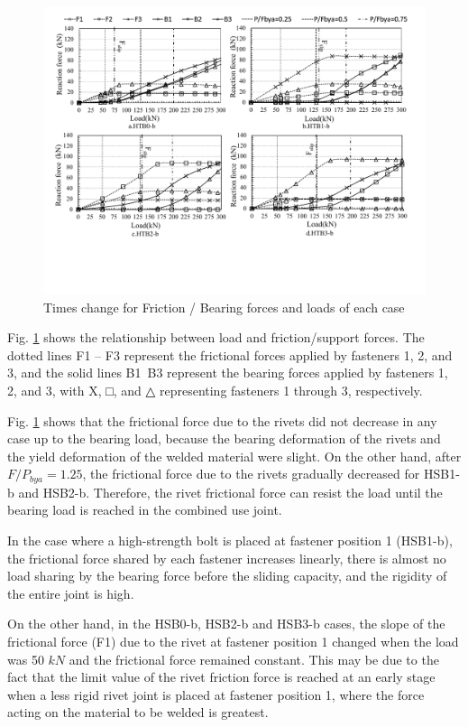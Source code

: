 \begin{figure}
    \centering
    \includegraphics[width=1\linewidth]{imgs//ch4/fast-time-load.pdf}
    \caption{Times change for Friction / Bearing forces and loads of each case}
    \label{fig-fastime}
\end{figure}

Fig. \ref{fig-fastime} shows the relationship between load and friction/support forces. The dotted lines F1 -- F3 represent the frictional forces applied by fasteners 1, 2, and 3, and the solid lines B1~B3 represent the bearing forces applied by fasteners 1, 2, and 3, with X, □, and △ representing fasteners 1 through 3, respectively.

Fig. \ref{fig-fastime} shows that the frictional force due to the rivets did not decrease in any case up to the bearing load, because the bearing deformation of the rivets and the yield deformation of the welded material were slight. On the other hand, after $F / P_{bya}  = 1.25$, the frictional force due to the rivets gradually decreased for HSB1-b and HSB2-b. Therefore, the rivet frictional force can resist the load until the bearing load is reached in the combined use joint.

In the case where a high-strength bolt is placed at fastener position 1 (HSB1-b), the frictional force shared by each fastener increases linearly, there is almost no load sharing by the bearing force before the sliding capacity, and the rigidity of the entire joint is high.

On the other hand, in the HSB0-b, HSB2-b and HSB3-b cases, the slope of the frictional force (F1) due to the rivet at fastener position 1 changed when the load was 50 $kN$ and the frictional force remained constant. This may be due to the fact that the limit value of the rivet friction force is reached at an early stage when a less rigid rivet joint is placed at fastener position 1, where the force acting on the material to be welded is greatest.

